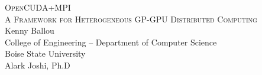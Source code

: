 \begin{titlepage}
\begin{center}

\textsc{\LARGE OpenCUDA+MPI}\\[1.5cm]
\textsc{\Large A Framework for Heterogeneous
               GP-GPU Distributed Computing}\\[1.5cm]

Kenny Ballou\\
College of Engineering -- Department of Computer Science\\
Boise State University\\
Alark Joshi, Ph.D\\
\vfill
\end{center}
\end{titlepage}
